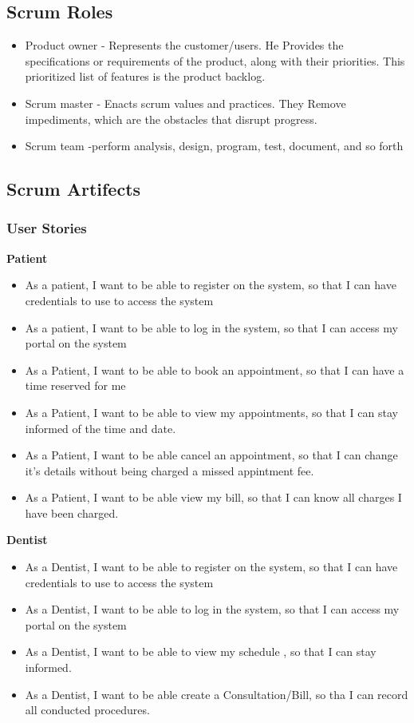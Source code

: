 \documentclass[12pt]{article}
\begin{document}
\subsection{Scrum Roles}
\begin{itemize}
    \item
    Product owner - Represents the customer/users.  He Provides the specifications or requirements of the product, along with their priorities. This prioritized list of features is the product backlog.
    \item
    Scrum master - Enacts scrum values and practices. They Remove impediments, which are the obstacles that disrupt progress.
    \item
    Scrum team -perform analysis, design, program, test, document, and so forth
    \end{itemize}
  \subsection{Scrum Artifects}
  \subsubsection{User Stories}
  \textbf{Patient}
  \begin{itemize}
  \item
  As a patient, I want to be able to register on the system, so that I can have credentials to use to access the system
  \item
  As a patient, I want to be able to log in the system, so that I can access my portal on the system
  \item
  As a Patient, I want to be able to book an appointment, so that I can 				have a time reserved for me
  \item
  As a Patient, I want to be able to view my appointments, so that I can stay informed of the time and date.
  \item
  As a Patient, I want to be able cancel an appointment, so that I can change it's details without being charged a missed appintment fee.
  \item
  As a Patient, I want to be able view my bill, so that I can know all charges I have been charged.
  \end{itemize}
   \textbf{Dentist}
   \begin{itemize}
    \item
  As a Dentist, I want to be able to register on the system, so that I can have credentials to use to access the system
  \item
  As a Dentist, I want to be able to log in the system, so that I can access my portal on the system
  \item
  As a Dentist, I want to be able to view my schedule , so that I can stay informed.
  \item
  As a Dentist, I want to be able create a Consultation/Bill, so tha I can record all conducted procedures.
   \end{itemize}
   
\end{document}

